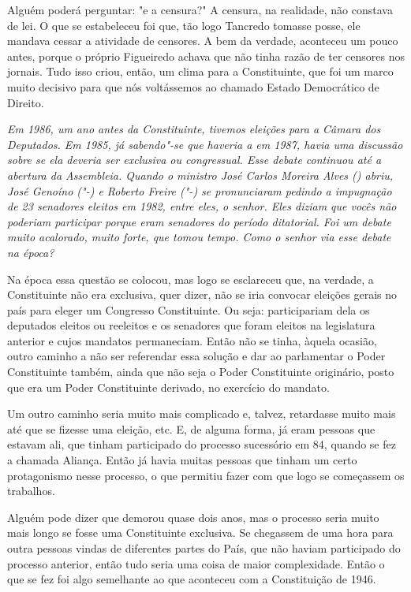 Alguém poderá perguntar: "e a censura?" A censura, na realidade, não
constava de lei. O que se estabeleceu foi que, tão logo Tancredo tomasse
posse, ele mandava cessar a atividade de censores. A bem da verdade,
aconteceu um pouco antes, porque o próprio Figueiredo achava que não
tinha razão de ter censores nos jornais. Tudo isso criou, então, um
clima para a Constituinte, que foi um marco muito decisivo para que nós
voltássemos ao chamado Estado Democrático de Direito.

\medskip

\emph{Em 1986, um ano antes da Constituinte, tivemos eleições para a
Câmara dos Deputados. Em 1985, já sabendo"-se que haveria a  em 1987,
havia uma discussão sobre se ela deveria ser exclusiva ou congressual.
Esse debate continuou até a abertura da Assembleia. Quando o ministro
José Carlos Moreira Alves () abriu, José Genoíno ("-) e Roberto
Freire ("-) se pronunciaram pedindo a impugnação de 23 senadores
eleitos em 1982, entre eles, o senhor. Eles diziam que vocês não
poderiam participar porque eram senadores do período ditatorial. Foi um
debate muito acalorado, muito forte, que tomou tempo. Como o senhor via
esse debate na época?}

Na época essa questão se colocou, mas logo se
esclareceu que, na verdade, a Constituinte não era exclusiva, quer
dizer, não se iria convocar eleições gerais no país para eleger um
Congresso Constituinte. Ou seja: participariam dela os deputados eleitos
ou reeleitos e os senadores que foram eleitos na legislatura anterior e
cujos mandatos permaneciam. Então não se tinha, àquela ocasião, outro
caminho a não ser referendar essa solução e dar ao parlamentar o Poder
Constituinte também, ainda que não seja o Poder Constituinte originário,
posto que era um Poder Constituinte derivado, no exercício do mandato.

Um outro caminho seria muito mais complicado e, talvez, retardasse muito
mais até que se fizesse uma eleição, etc. E, de alguma forma, já eram
pessoas que estavam ali, que tinham participado do processo sucessório
em 84, quando se fez a chamada Aliança. Então já havia muitas pessoas
que tinham um certo protagonismo nesse processo, o que permitiu fazer
com que logo se começassem os trabalhos.

Alguém pode dizer que demorou quase dois anos, mas o processo seria
muito mais longo se fosse uma Constituinte exclusiva. Se chegassem de
uma hora para outra pessoas vindas de diferentes partes do País, que não
haviam participado do processo anterior, então tudo seria uma coisa de
maior complexidade. Então o que se fez foi algo semelhante ao que
aconteceu com a Constituição de 1946.

